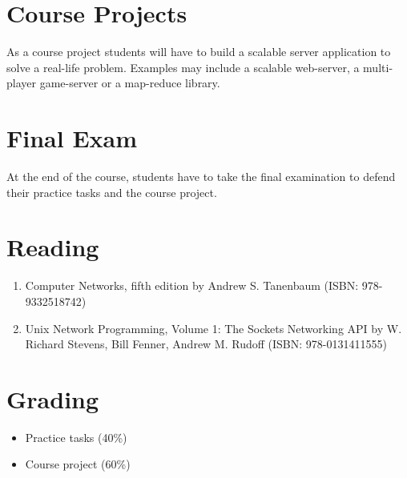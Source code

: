 \documentclass[12pt,a4paper,oneside]{article}
\begin{document}
    \section{Course Projects}

        As a course project students will have to build a scalable server application to
        solve a real-life problem. Examples may include a scalable web-server, a multi-player
        game-server or a map-reduce library.

    \section{Final Exam}

        At the end of the course, students have to take the final examination to defend their
        practice tasks and the course project.

    \section{Reading}

        \begin{enumerate}
            \item Computer Networks, fifth edition by Andrew S. Tanenbaum (ISBN: 978-9332518742)
            \item Unix Network Programming, Volume 1: The Sockets Networking API by W. Richard Stevens, Bill Fenner, Andrew M. Rudoff (ISBN: 978-0131411555)
        \end{enumerate}

    \section{Grading}

        \begin{itemize}
            \item Practice tasks (40\%)
            \item Course project (60\%)
        \end{itemize}
\end{document}
